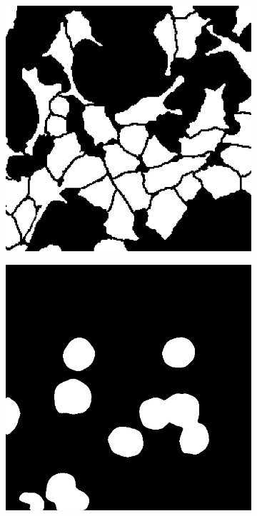 \documentclass[10pt, journal, compsoc]{IEEEtran}
\begin{document}
\begin{figure}
\begin{subfigure}[b]{0.49\linewidth}
\includegraphics[width=\linewidth]{unet/110115.jpg}
\caption{}
\end{subfigure}
\begin{subfigure}[b]{0.49\linewidth}
\includegraphics[width=\linewidth]{c127/deeplab/108641.jpg}

\end{subfigure}
\end{figure}
\end{document}

